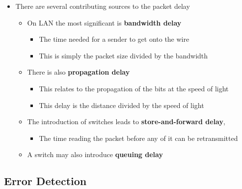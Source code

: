 \documentclass[11pt]{article}
\providecommand{\tightlist}{%
      \setlength{\itemsep}{0pt}\setlength{\parskip}{0pt}}
\begin{document}
\begin{itemize}
\tightlist
\item
  There are several contributing sources to the packet delay

  \begin{itemize}
  \tightlist
  \item
    On LAN the most significant is \textbf{bandwidth delay}

    \begin{itemize}
    \tightlist
    \item
      The time needed for a sender to get onto the wire
    \item
      This is simply the packet size divided by the bandwidth
    \end{itemize}
  \item
    There is also \textbf{propagation delay}

    \begin{itemize}
    \tightlist
    \item
      This relates to the propagation of the bits at the speed of light
    \item
      This delay is the distance divided by the speed of light
    \end{itemize}
  \item
    The introduction of switches leads to \textbf{store-and-forward
    delay},

    \begin{itemize}
    \tightlist
    \item
      The time reading the packet before any of it can be retransmitted
    \end{itemize}
  \item
    A switch may also introduce \textbf{queuing delay}
  \end{itemize}
\end{itemize}

    \subsection{Error Detection}\label{error-detection}
\end{document}
